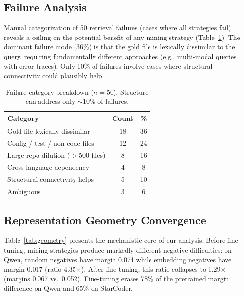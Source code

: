 \documentclass[11pt,a4paper]{article}
\begin{document}
\subsection{Failure Analysis}
\label{sec:failure}

Manual categorization of 50 retrieval failures (cases where all strategies fail) reveals a ceiling on the potential benefit of any mining strategy (Table~\ref{tab:failure}).
The dominant failure mode (36\%) is that the gold file is lexically dissimilar to the query, requiring fundamentally different approaches (e.g., multi-modal queries with error traces).
Only 10\% of failures involve cases where structural connectivity could plausibly help.

\begin{table}[t]
\centering
\caption{Failure category breakdown ($n=50$). Structure can address only $\sim$10\% of failures.}
\label{tab:failure}
\small
\begin{tabular}{lcc}
\toprule
\textbf{Category} & \textbf{Count} & \textbf{\%} \\
\midrule
Gold file lexically dissimilar & 18 & 36 \\
Config / test / non-code files & 12 & 24 \\
Large repo dilution ($>$500 files) & 8 & 16 \\
Cross-language dependency & 4 & 8 \\
Structural connectivity helps & 5 & 10 \\
Ambiguous & 3 & 6 \\
\bottomrule
\end{tabular}
\end{table}

\subsection{Representation Geometry Convergence}
\label{sec:geometry}

Table~\ref{tab:geometry} presents the mechanistic core of our analysis.
Before fine-tuning, mining strategies produce markedly different negative difficulties: on Qwen, random negatives have margin 0.074 while embedding negatives have margin 0.017 (ratio 4.35$\times$).
After fine-tuning, this ratio collapses to 1.29$\times$ (margins 0.067 vs.\ 0.052).
Fine-tuning erases 78\% of the pretrained margin difference on Qwen and 65\% on StarCoder.
\end{document}
